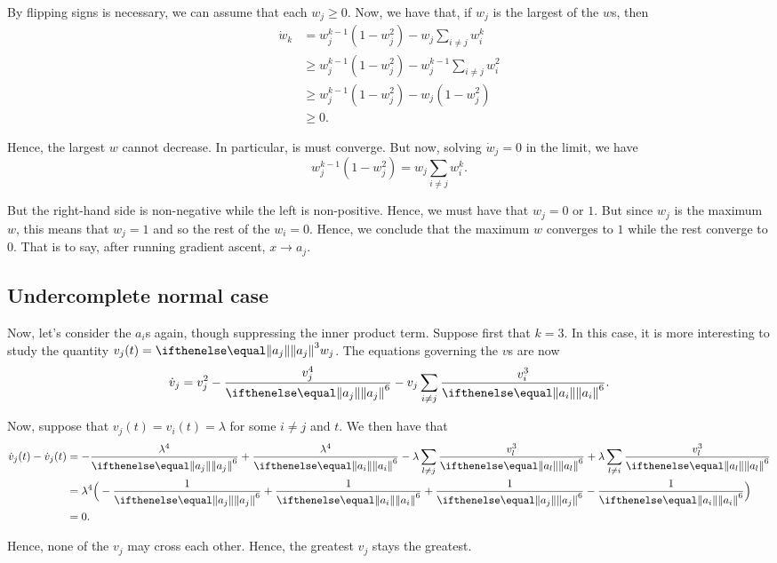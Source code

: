 \documentclass{hw-scrartcl}
\begin{document}
By flipping signs is necessary, we can assume that each \(w_j \geq 0\). Now, we have that, if \(w_j\) is the largest of the \(w\)s, then
\begin{align*}
  \dot{w}_k
  &= w_j^{k-1}(1 - w_j^2) - w_j \sum_{i \neq j} w_i^k \\
  &\geq w_j^{k-1}(1-w_j^2) - w_j^{k-1}\sum_{i\neq j} w_i^2 \\
  &\geq w_j^{k-1}(1 - w_j^2) - w_j(1 - w_j^2) \\
  &\geq 0.
\end{align*}

Hence, the largest \(w\) cannot decrease. In particular, is must converge. But now, solving \(\dot{w}_j = 0\) in the limit, we have
\[
  w_j^{k-1}(1 - w_j^2)
  = w_j \sum_{i\neq j} w_i^k.
\]

But the right-hand side is non-negative while the left is non-positive. Hence, we must have that \(w_j = 0\) or \(1\). But since \(w_j\) is the maximum \(w\), this means that \(w_j = 1\) and so the rest of the \(w_i = 0\). Hence, we conclude that the maximum \(w\) converges to \(1\) while the rest converge to \(0\). That is to say, after running gradient ascent, \(x \rightarrow a_j\).

\subsection{Undercomplete normal case}
Now, let's consider the \(a_i\)s again, though suppressing the inner product term. Suppose first that \(k = 3\). In this case, it is more interesting to study the quantity \(v_j(t) = \norm{a_j}^3 w_j\). The equations governing the \(v\)s are now
\[
  \dot{v}_j
  = v_j^2 - \frac{v_j^4}{\norm{a_j}^6} - v_j \sum_{i\neq j} \frac{v_i^3}{\norm{a_i}^6}.
\]

Now, suppose that \(v_j(t) = v_i(t) = \lambda\) for some \(i\neq j\) and \(t\). We then have that
\begin{align*}
  \dot{v}_j(t) - \dot{v}_j(t)
  &= -\frac{\lambda^4}{\norm{a_j}^6} + \frac{\lambda^4}{\norm{a_i}^6} - \lambda\sum_{l\neq j}\frac{v_l^3}{\norm{a_l}^6} + \lambda \sum_{l\neq i} \frac{v_l^3}{\norm{a_l}^6} \\
  &= \lambda^4\Big(-\frac{1}{\norm{a_j}^6} + \frac{1}{\norm{a_i}^6} + \frac{1}{\norm{a_j}^6} - \frac{1}{\norm{a_i}^6}\Big) \\
  &= 0.
\end{align*}

Hence, none of the \(v_j\) may cross each other. Hence, the greatest \(v_j\) stays the greatest.
\end{document}
